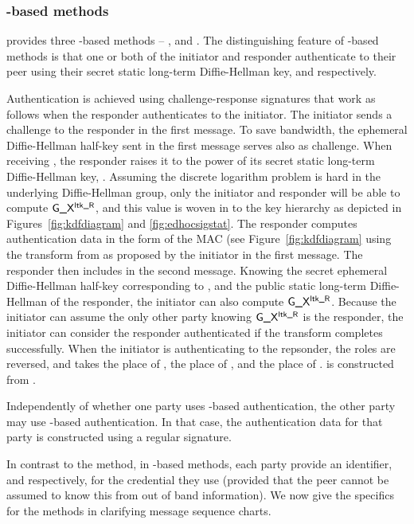 \subsubsection{\mStat-based methods}
\mEdhoc{} provides three \mStat-based methods -- \mSigStat{}, \mStatStat{} and
\mStatSig{}.
%
The distinguishing feature of \mStat-based methods is that one or both of
the initiator and responder authenticate to their peer using their secret
static long-term Diffie-Hellman key, \mLtki{} and \mLtkr{} respectively.
%

Authentication is achieved using challenge-response signatures that work as
follows when the responder authenticates to the initiator.
%
The initiator sends a challenge to the responder in the first message.
%
To save bandwidth, the ephemeral Diffie-Hellman half-key \mGx{} sent in the
first message serves also as challenge.
%
When receiving \mGx{}, the responder raises it to the power of its secret
static long-term Diffie-Hellman key, \mLtkr{}.
%
Assuming the discrete logarithm problem is hard in the underlying Diffie-Hellman
group, only the initiator and responder will be able to compute
$\text{\textup{\textsf{G\_X}}}{}^{\text{\textup{\textsf{ltk\_R}}}}{}$, and this value is woven in to the key hierarchy as depicted
in Figures~\ref{fig:kdfdiagram} and \ref{fig:edhocsigstat}.
%
The responder computes authentication data \mAuthr{} in the form of the MAC
\mMactwo{} (see Figure~\ref{fig:kdfdiagram} using the \mAead{} transform from
\mSuites{} as proposed by the initiator in the first message.
%
The responder then includes \mMactwo{} in the second message.
%
Knowing the secret ephemeral Diffie-Hellman half-key corresponding to \mGx{},
and the public static long-term Diffie-Hellman of the responder, the initiator
can also compute $\text{\textup{\textsf{G\_X}}}{}^{\text{\textup{\textsf{ltk\_R}}}}{}$.
%
Because the initiator can assume the only other party knowing
$\text{\textup{\textsf{G\_X}}}{}^{\text{\textup{\textsf{ltk\_R}}}}{}$ is the responder, the initiator can consider the responder
authenticated if the \mAead{} transform completes successfully.
%
When the initiator is authenticating to the repsonder, the roles are reversed,
and \mGy{} takes the place of \mGx{}, \mLtki{} the place of \mLtkr{}, and
\mAuthi{} the place of \mAuthr{}.
%
\mAuthi{} is constructed from \mMacthree{}.
%

Independently of whether one party uses \mStat{}-based authentication, the other
party may use \mSig{}-based authentication.
%
In that case, the authentication data for that party is constructed
using a regular signature.
%

In contrast to the \mPskPsk{} method, in \mStat{}-based methods, each party
provide an identifier, \mIdcredi{} and \mIdcredr{} respectively, for the
credential they use (provided that the peer cannot be assumed to know this
from out of band information).
%
We now give the specifics for the methods in clarifying message sequence charts.
%

